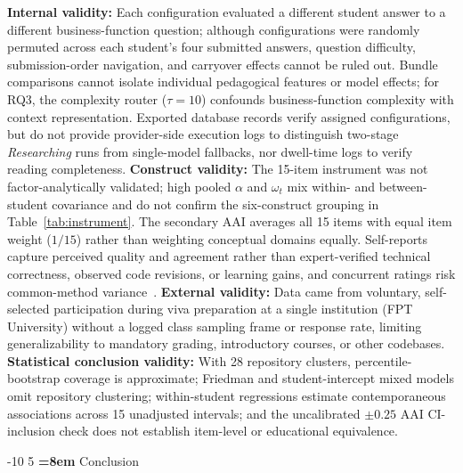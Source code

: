 \documentclass{llncs}
\makeatletter
\renewcommand\section{\@startsection{section}{1}{\z@}%
                       {-10\p@ \@plus -2\p@ \@minus -2\p@}%
                       {5\p@ \@plus 1\p@ \@minus 1\p@}%
                       {\normalfont\large\bfseries\boldmath
                        \rightskip=\z@ \@plus 8em\pretolerance=10000 }}
\makeatother
\begin{document}
\textbf{Internal validity:} Each configuration evaluated a different student answer to a different business-function question; although configurations were randomly permuted across each student's four submitted answers, question difficulty, submission-order navigation, and carryover effects cannot be ruled out. Bundle comparisons cannot isolate individual pedagogical features or model effects; for RQ3, the complexity router ($\tau = 10$) confounds business-function complexity with context representation. Exported database records verify assigned configurations, but do not provide provider-side execution logs to distinguish two-stage \textit{Researching} runs from single-model fallbacks, nor dwell-time logs to verify reading completeness. \textbf{Construct validity:} The 15-item instrument was not factor-analytically validated; high pooled $\alpha$ and $\omega_t$ mix within- and between-student covariance and do not confirm the six-construct grouping in Table~\ref{tab:instrument}. The secondary AAI averages all 15 items with equal item weight ($1/15$) rather than weighting conceptual domains equally. Self-reports capture perceived quality and agreement rather than expert-verified technical correctness, observed code revisions, or learning gains, and concurrent ratings risk common-method variance~\cite{podsakoff2003common}. \textbf{External validity:} Data came from voluntary, self-selected participation during viva preparation at a single institution (FPT University) without a logged class sampling frame or response rate, limiting generalizability to mandatory grading, introductory courses, or other codebases. \textbf{Statistical conclusion validity:} With 28 repository clusters, percentile-bootstrap coverage is approximate; Friedman and student-intercept mixed models omit repository clustering; within-student regressions estimate contemporaneous associations across 15 unadjusted intervals; and the uncalibrated $\pm 0.25$ AAI CI-inclusion check does not establish item-level or educational equivalence.

\section{Conclusion}
\label{sec:conclusion}
\end{document}
